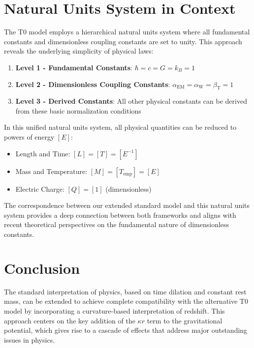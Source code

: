 \documentclass[12pt,a4paper]{article}
\newcommand{\alphaEM}{\alpha_{\text{EM}}}
\newcommand{\alphaW}{\alpha_{\text{W}}}
\newcommand{\betaT}{\beta_{\text{T}}}
\begin{document}
	\section{Natural Units System in Context}
	\label{sec:natural_units_context}
	
	The T0 model employs a hierarchical natural units system where all fundamental constants and dimensionless coupling constants are set to unity\cite{pascher_alphabeta_2025}. This approach reveals the underlying simplicity of physical laws:
	
	\begin{enumerate}
		\item \textbf{Level 1 - Fundamental Constants}: $\hbar = c = G = k_B = 1$\cite{planck1899}
		\item \textbf{Level 2 - Dimensionless Coupling Constants}: $\alphaEM = \alphaW = \betaT = 1$\cite{pascher_alpha_2025}
		\item \textbf{Level 3 - Derived Constants}: All other physical constants can be derived from these basic normalization conditions\cite{pascher_alphabeta_2025}
	\end{enumerate}
	
	In this unified natural units system, all physical quantities can be reduced to powers of energy $[E]$\cite{pascher_alpha_2025}:
	\begin{itemize}
		\item Length and Time: $[L] = [T] = [E^{-1}]$
		\item Mass and Temperature: $[M] = [T_{\text{emp}}] = [E]$
		\item Electric Charge: $[Q] = [1]$ (dimensionless)
	\end{itemize}
	
	The correspondence between our extended standard model and this natural units system provides a deep connection between both frameworks and aligns with recent theoretical perspectives on the fundamental nature of dimensionless constants\cite{duff2002}.
	
	\section{Conclusion}
	\label{sec:conclusion}
	
	The standard interpretation of physics, based on time dilation and constant rest mass, can be extended to achieve complete compatibility with the alternative T0 model by incorporating a curvature-based interpretation of redshift. This approach centers on the key addition of the $\kappa r$ term to the gravitational potential, which gives rise to a cascade of effects that address major outstanding issues in physics.
	
\end{document}

